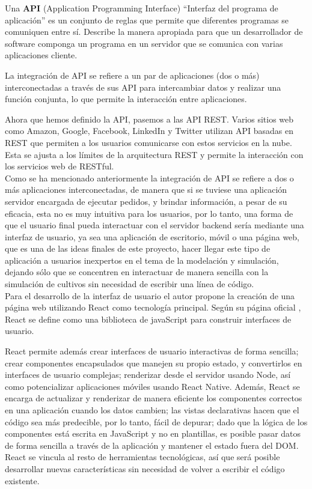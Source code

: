 Una \textbf{API} \parencite{apirest_definicion_2020} (Application Programming Interface)  “Interfaz del programa de aplicación” es un conjunto de reglas que permite que diferentes programas se comuniquen entre sí. Describe la manera apropiada para que un desarrollador de software componga un programa en un servidor que se comunica con varias aplicaciones cliente.

La integración de API se refiere a un par de aplicaciones (dos o más) interconectadas a través de sus API para intercambiar datos y realizar una función conjunta, lo que permite la interacción entre aplicaciones.

Ahora que hemos definido la API, pasemos a las API REST. Varios sitios web como Amazon, Google, Facebook, LinkedIn y Twitter utilizan API basadas en REST que permiten a los usuarios comunicarse con estos servicios en la nube. Esta se ajusta a los límites de la arquitectura REST y permite la interacción con los servicios web de RESTful.\\

Como se ha mencionado anteriormente la integración de API se refiere a dos o más aplicaciones interconectadas, de manera que si se tuviese una aplicación servidor encargada de ejecutar pedidos, y brindar información, a pesar de su eficacia, esta no es muy intuitiva para los usuarios, por lo tanto, una forma de que el usuario final pueda interactuar con el servidor backend sería mediante una interfaz de usuario, ya sea una aplicación de escritorio, móvil o una página web, que es una de las ideas finales de este proyecto, hacer llegar este tipo de aplicación a usuarios inexpertos en el tema de la modelación y simulación, dejando sólo que se concentren en interactuar de manera sencilla con la simulación de cultivos sin necesidad de escribir una línea de código.\\

Para el desarrollo de la interfaz de usuario el autor propone la creación de una página web utilizando React como tecnología principal. Según su página oficial \parencite{react_oficial_page}, React se define como una biblioteca de javaScript para construir interfaces de usuario. 

React permite además crear interfaces de usuario interactivas de forma sencilla; crear componentes encapsulados que manejen su propio estado, y convertirlos en interfaces de usuario complejas; renderizar desde el servidor usando Node, así como potencializar aplicaciones móviles usando React Native. Además, React se encarga de actualizar y renderizar de manera eficiente los componentes correctos en una aplicación cuando los datos cambien; las vistas declarativas hacen que el código sea más predecible, por lo tanto, fácil de depurar; dado que la lógica de los componentes está escrita en JavaScript y no en plantillas, es posible pasar datos de forma sencilla a través de la aplicación y mantener el estado fuera del DOM. React se vincula al resto de herramientas tecnológicas, así que será posible desarrollar nuevas características sin necesidad de volver a escribir el código existente.\\

